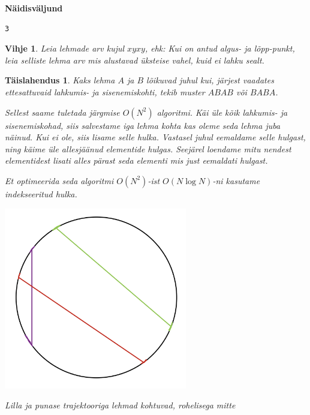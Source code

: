 \documentclass{trkut}
\newtheorem*{vihje}{Vihje}
\newtheorem*{solution}{Täislahendus}
\begin{document}
\textbf{Näidisväljund}

\begin{verbatim}
3
\end{verbatim}


\begin{vihje}
Leia lehmade arv kujul $xyxy$, ehk:
Kui on antud algus- ja lõpp-punkt, leia selliste lehma arv mis alustavad üksteise vahel, kuid ei lahku sealt.
\end{vihje}

\begin{solution}
Kaks lehma $A$ ja $B$  lõikuvad juhul kui, järjest vaadates ettesattuvaid lahkumis- ja sisenemiskohti, tekib muster $ABAB$ või $BABA$. 

Sellest saame tuletada järgmise $O(N^2)$ algoritmi. Käi üle kõik lahkumis- ja sisenemiskohad, siis salvestame iga lehma kohta kas oleme seda lehma juba näinud.
Kui ei ole, siis lisame selle hulka. Vastasel juhul eemaldame selle hulgast, ning käime üle allesjäänud elementide hulgas. Seejärel loendame mitu nendest elementidest lisati alles pärast seda elementi mis just eemaldati hulgast.

Et optimeerida seda algoritmi $O(N^2)$-ist $O(N\log N)$-ni kasutame indekseeritud hulka.
\begin{kk}[H]%
    \includegraphics[width=8cm]{lehm.png}%
    \caption{Lilla ja punase trajektooriga lehmad kohtuvad, rohelisega mitte}%
    \label{EMaxx}%
\end{kk}
\end{solution}
\end{document}
